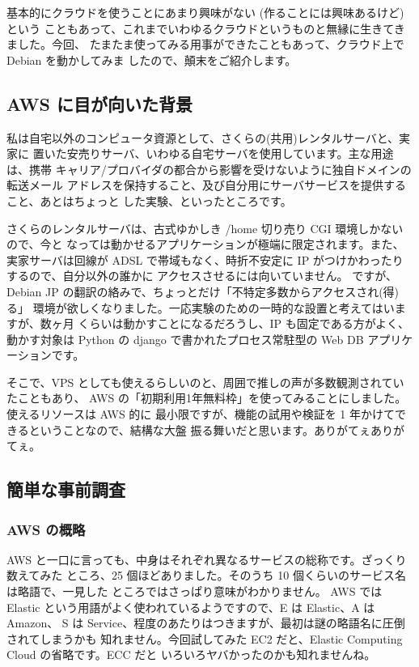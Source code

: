 \documentclass[mingoth,a4paper]{jsarticle}
\begin{document}
基本的にクラウドを使うことにあまり興味がない (作ることには興味あるけど) という
こともあって、これまでいわゆるクラウドというものと無縁に生きてきました。今回、
たまたま使ってみる用事ができたこともあって、クラウド上で Debian を動かしてみま
したので、顛末をご紹介します。

\subsection{AWS に目が向いた背景}

私は自宅以外のコンピュータ資源として、さくらの(共用)レンタルサーバと、実家に
置いた安売りサーバ、いわゆる自宅サーバを使用しています。主な用途は、携帯
キャリア/プロバイダの都合から影響を受けないように独自ドメインの転送メール
アドレスを保持すること、及び自分用にサーバサービスを提供すること、あとはちょっと
した実験、といったところです。

さくらのレンタルサーバは、古式ゆかしき /home 切り売り CGI 環境しかないので、今と
なっては動かせるアプリケーションが極端に限定されます。また、実家サーバは回線が
ADSL で帯域もなく、時折不安定に IP がつけかわったりするので、自分以外の誰かに
アクセスさせるには向いていません。
ですが、Debian JP の翻訳の絡みで、ちょっとだけ「不特定多数からアクセスされ(得)る」
環境が欲しくなりました。一応実験のための一時的な設置と考えてはいますが、数ヶ月
くらいは動かすことになるだろうし、IP も固定である方がよく、動かす対象は Python の
django で書かれたプロセス常駐型の Web DB アプリケーションです。

そこで、VPS としても使えるらしいのと、周囲で推しの声が多数観測されていたこともあり、
AWS の「初期利用1年無料枠」を使ってみることにしました。使えるリソースは AWS 的に
最小限ですが、機能の試用や検証を 1 年かけてできるということなので、結構な大盤
振る舞いだと思います。ありがてぇありがてぇ。

\subsection{簡単な事前調査}

\subsubsection{AWS の概略}
AWS と一口に言っても、中身はそれぞれ異なるサービスの総称です。ざっくり数えてみた
ところ、25 個ほどありました。そのうち 10 個くらいのサービス名は略語で、一見した
ところではさっぱり意味がわかりません。
AWS では Elastic という用語がよく使われているようですので、E は Elastic、A は Amazon、
S は Service、程度のあたりはつきますが、最初は謎の略語名に圧倒されてしまうかも
知れません。今回試してみた EC2 だと、Elastic Computing Cloud の省略です。ECC だと
いろいろヤバかったのかも知れませんね。
\end{document}
